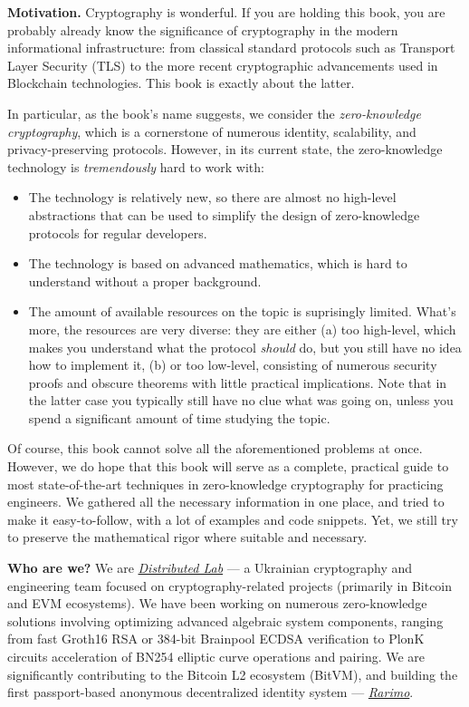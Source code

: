 \documentclass[lecture-notes.tex]{subfiles}
\begin{document}
\textbf{Motivation.} Cryptography is wonderful. If you are holding this book, you are probably 
already know the significance of cryptography in the modern 
informational infrastructure: from classical standard protocols such as 
Transport Layer Security (TLS) to the more recent cryptographic
advancements used in Blockchain technologies. This book is 
exactly about the latter.

In particular, as the book's name suggests, we consider the \emph{zero-knowledge
cryptography}, which is a cornerstone of numerous identity, scalability, and
privacy-preserving protocols. However, in its current state, the zero-knowledge
technology is \emph{tremendously} hard to work with:
\begin{itemize}
    \item The technology is relatively new, so there are almost 
    no high-level abstractions that can be used to simplify the
    design of zero-knowledge protocols for regular developers.
    \item The technology is based on advanced mathematics, which is hard to
    understand without a proper background.
    \item The amount of available resources on the topic is suprisingly limited.
    What's more, the resources are very diverse: they are either (a) too
    high-level, which makes you understand what the protocol \emph{should} do,
    but you still have no idea how to implement it, (b) or too low-level,
    consisting of numerous security proofs and obscure theorems with little
    practical implications. Note that in the latter case you typically still
    have no clue what was going on, unless you spend a significant amount of
    time studying the topic.
\end{itemize}

Of course, this book cannot solve all the aforementioned problems at once.
However, we do hope that this book will serve as a complete, practical guide to
most state-of-the-art techniques in zero-knowledge cryptography for practicing
engineers. We gathered all the necessary information in one place, and tried to
make it easy-to-follow, with a lot of examples and code snippets. Yet, we still
try to preserve the mathematical rigor where suitable and necessary.

\textbf{Who are we?} We are \href{https://distributedlab.com/}{\emph{Distributed
Lab}} --- a Ukrainian cryptography and engineering team focused on
cryptography-related projects (primarily in Bitcoin and EVM ecosystems). We have
been working on numerous zero-knowledge solutions involving optimizing advanced
algebraic system components, ranging from fast Groth16 RSA or 384-bit Brainpool
ECDSA verification to PlonK circuits acceleration of BN254 elliptic curve
operations and pairing. We are significantly contributing to the Bitcoin L2
ecosystem (BitVM), and building the first passport-based anonymous decentralized
identity system --- \href{https://rarimo.com/}{\emph{Rarimo}}. 
\end{document}
